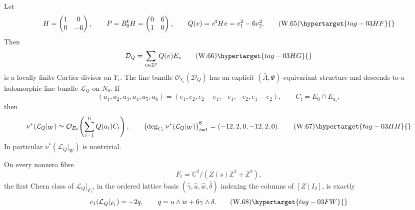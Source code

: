 \begin{proposition}
\hypertarget{tag-03IN}{}\label{wbII:prop:local-cusp-picard-obstruction}

Let
\[
 H=\begin{pmatrix}1&0\\0&-6\end{pmatrix},
 \qquad
 P=B_0^{\mathsf t}H=\begin{pmatrix}0&6\\1&0\end{pmatrix},
 \qquad
 Q(v)=v^{\mathsf t}Hv=v_1^2-6v_2^2.
\tag{W.65}\hypertarget{tag-03HF}{}\label{wbII:eq:W:5.17x}
\]
Then
\[
 \mathcal D_Q=\sum_{v\in\mathbb Z^2}Q(v)E_v
\tag{W.66}\hypertarget{tag-03HG}{}\label{wbII:eq:W:5.17y}
\]
is a locally finite Cartier divisor on \(Y_\epsilon\).
The line bundle \(\mathcal O_{Y_\epsilon}(\mathcal D_Q)\) has an explicit
\((\bar\Lambda,\Psi)\)-equivariant structure and descends to a holomorphic
line bundle \(\mathcal L_Q\) on \(N_0\).  If
\[
 (a_1,a_2,a_3,a_4,a_5,a_6)
 =(e_1,e_2,e_2-e_1,-e_1,-e_2,e_1-e_2),
 \qquad C_i=E_0\cap E_{a_i},
\]
then
\[
 \nu^*(\mathcal L_Q|_W)
 \simeq
 \mathcal O_{E_0}\!\left(\sum_{i=1}^6Q(a_i)C_i\right),
\qquad
 \left(\deg_{C_i}\nu^*(\mathcal L_Q|_W)\right)_{i=1}^6
 =(-12,2,0,-12,2,0).
\tag{W.67}\hypertarget{tag-03HH}{}\label{wbII:eq:W:5.17z}
\]
In particular \(\nu^*(\mathcal L_Q|_W)\) is nontrivial.

On every nonzero fibre
\[
 F_t=\mathbb C^2/(Z(s)\mathbb Z^2+\mathbb Z^2),
\]
the first Chern class of \(\mathcal L_Q|_{F_t}\), in the ordered lattice
basis
\((\widehat\gamma,\widehat u,\widehat w,\widehat\delta)\) indexing the
columns of \([Z\mid I_2]\), is exactly
\[
 c_1(\mathcal L_Q|_{F_t})=-2q,
 \qquad
 q=u\wedge w+6\gamma\wedge\delta.
\tag{W.68}\hypertarget{tag-03FW}{}\label{wbII:eq:W:5.17aa}
\]
\end{proposition}



